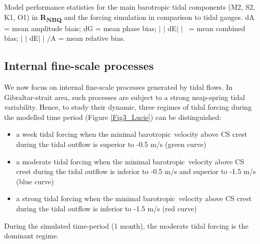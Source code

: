 \begin{table}[!h]

\caption{Model performance statistics for the main barotropic tidal components (M2, S2, K1, O1) in \textbf{R\textsubscript{NBQ}} and the forcing simulation in comparison to tidal gauges. dA = mean amplitude biais; dG = mean phase bias; $ \vert $ $ \vert $ dE$ \vert $ $ \vert $ \ = mean combined bias;  $ \vert $ $ \vert $ dE$ \vert $ $ \vert $ /A = mean relative bias.}
\label{Tab4_Lucie}

 \end{table}

\vspace{\baselineskip}
\subsection{Internal fine-scale processes }

\vspace{\baselineskip}
We now focus on internal fine-scale processes generated by tidal flows. In Gibraltar-strait area, such processes are subject to a strong neap-spring tidal variability. Hence, to study their dynamic, three regimes of tidal forcing during the modelled time period (Figure \ref{Fig3_Lucie}) can be distinguished:\par

\begin{itemize}
	\item a week tidal forcing when the minimal barotropic\ velocity above CS crest  during the tidal outflow is superior to -0.5 m/s (green curve)\par

	\item a moderate tidal forcing when the minimal barotropic\ velocity above CS crest  during the tidal outflow is inferior to -0.5 m/s and superior to -1.5 m/s (blue curve)\par

	\item a strong tidal forcing when the minimal barotropic\ velocity above CS crest  during the tidal outflow is inferior to -1.5 m/s (red curve)
\end{itemize}
During the simulated time-period (1 month), the moderate tidal forcing is the dominant regime.\\
\vspace{\baselineskip}



